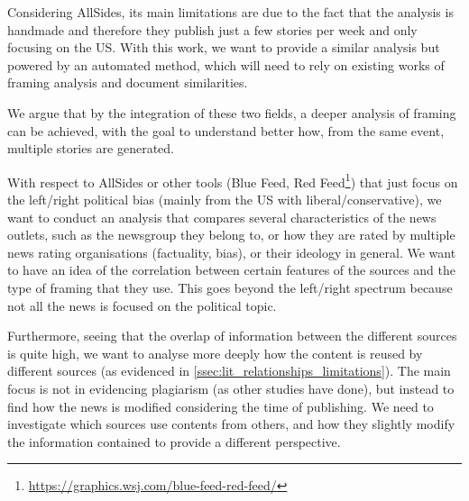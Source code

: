 Considering AllSides, its main limitations are due to the fact that the analysis is handmade and therefore they publish just a few stories per week and only focusing on the US.
With this work, we want to provide a similar analysis but powered by an automated method, which will need to rely on existing works of framing analysis and document similarities.




We argue that by the integration of these two fields, a deeper analysis of framing can be achieved, with the goal to understand better how, from the same event, multiple stories are generated.


With respect to AllSides or other tools (Blue Feed, Red Feed\footnote{\url{https://graphics.wsj.com/blue-feed-red-feed/}}) that just focus on the left/right political bias (mainly from the US with liberal/conservative), we want to conduct an analysis that compares several characteristics of the news outlets, such as the newsgroup they belong to, or how they are rated by multiple news rating organisations (factuality, bias), or their ideology in general.
We want to have an idea of the correlation between certain features of the sources and the type of framing that they use. This goes beyond the left/right spectrum because not all the news is focused on the political topic.


Furthermore, seeing that the overlap of information between the different sources is quite high, we want to analyse more deeply how the content is reused by different sources (as evidenced in \ref{ssec:lit_relationships_limitations}). The main focus is not in evidencing plagiarism (as other studies have done), but instead to find how the news is modified considering the time of publishing.
We need to investigate which sources use contents from others, and how they slightly modify the information contained to provide a different perspective.

